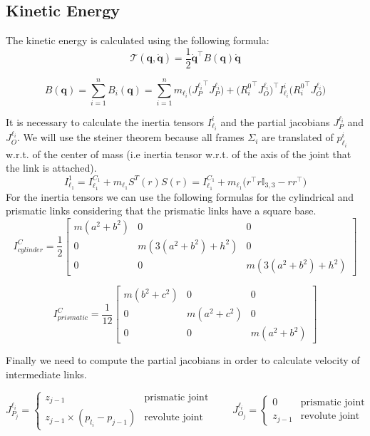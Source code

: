 \documentclass[a4paper,12pt]{article}
\renewcommand*{\l}{\ell}
\newcommand*{\T}{^\top}
\newcommand*{\I}{\mathbb{I}}
\newcommand*{\q}{\bm{q}}
\newcommand*{\dotq}{\dot{\q}}
\begin{document}
\subsection{Kinetic Energy}
The kinetic energy is calculated using the following formula:
\[
\mathcal{T}(\q,\dotq) = \frac{1}{2}\dotq\T B(\q) \dotq
\]

\[
B(\q) = \sum_{i=1}^{n} B_i(\q)
      = \sum_{i=1}^{n} m_{\l_i} \bigl({J^{\l_i}_{P}}\T J^{\l_i}_{P}\bigr)
       +  \bigl({R_i^0}\T J^{\l_i}_{O}\bigr)\T I_{\l_i}^{i} \bigl({R_i^0}\T J^{\l_i}_{O}\bigr)
\]

\noindent It is necessary to calculate the inertia tensors $I_{\l_i}^{i}$ and the partial jacobians $J^{\l_i}_{P}$ and $J^{\l_i}_{O}$. We will use the steiner theorem because all frames $\Sigma_i$ are translated of $p_{\l_i}^{i}$ w.r.t. of the center of mass (i.e inertia tensor w.r.t. of the axis of the joint that the
link is attached).
\[
    I_{\l_1}^{1} = I_{\l_1}^{C_1} + m_{\l_1}S^{T}(r)S(r) = I_{\l_1}^{C_1}  +  m_{\l_1}\bigl(r\T r \I_{3,3}  -  r r\T\bigr) 
\]
For the inertia tensors we can use the following formulas for the cylindrical and prismatic links considering that the prismatic links have a square base.
\[
    I^C_{cylinder} = \frac{1}{2}\begin{bmatrix}
        m(a^2+b^2) & 0 &0 \\
        0 &m(3(a^2+b^2)+h^2)& 0 \\
        0& 0& m(3(a^2+b^2)+h^2)
    \end{bmatrix}
\]

\[
    I^C_{prismatic} = \frac{1}{12}\begin{bmatrix}
        m(b^2+c^2) & 0 &0 \\
        0 &m(a^2+c^2)& 0 \\
        0& 0& m(a^2+b^2)
    \end{bmatrix}
\]

\bigskip
\noindent Finally we need to compute the partial jacobians in order to calculate velocity of intermediate links.

\[
    J^{\l_i}_{P_j} = \begin{cases}
       z_{j-1} & \text{prismatic joint} \\
       z_{j-1} \times (p_{l_i}- p_{j-1}) & \text{revolute joint} 
      \end{cases}
    \qquad
    J^{\l_i}_{O_j} = \begin{cases}
    0 & \text{prismatic joint} \\
    z_{j-1} & \text{revolute joint} 
    \end{cases}
\]
\end{document}

